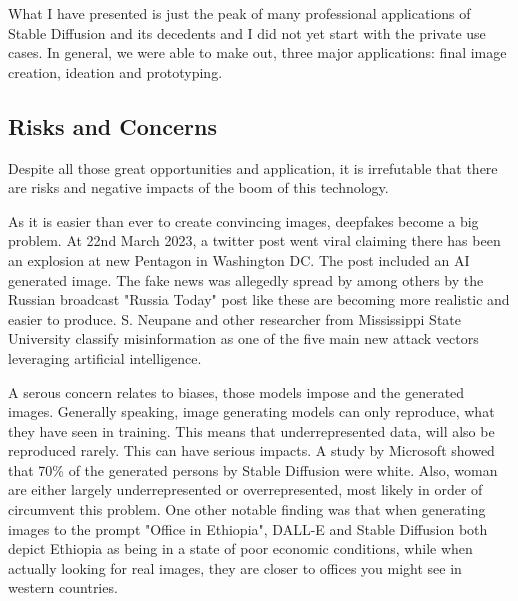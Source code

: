 \documentclass[11pt]{article}
\begin{document}
What I have presented is just the peak of many professional applications of Stable Diffusion and its decedents and I did not yet start with the private use cases. In general, we were able to make out, three major applications: final image creation, ideation and prototyping.

\subsection{Risks and Concerns}
Despite all those great opportunities and application, it is irrefutable that there are risks and negative impacts of the boom of this technology.

As it is easier than ever to create convincing images, deepfakes become a big problem. At 22nd March 2023, a twitter post went viral claiming there has been an explosion at new Pentagon in Washington DC. The post included an AI generated image. The fake news was allegedly spread by among others by the Russian broadcast "Russia Today"\cite{correctiv2023pentagonexplosion} post like these are becoming more realistic and easier to produce. S. Neupane and other researcher from Mississippi State University\cite{neupane2023impactsriskgenerativeai} classify misinformation as one of the five main new attack vectors leveraging artificial intelligence.

A serous concern relates to biases, those models impose and the generated images. Generally speaking, image generating models can only reproduce, what they have seen in training. This means that underrepresented data, will also be reproduced rarely. This can have serious impacts. A study by Microsoft\cite{naik2023socialbiasesthroughtexttoimage} showed that 70\% of the generated persons by Stable Diffusion were white. Also, woman are either largely underrepresented or overrepresented, most likely in order of circumvent this problem. One other notable finding was that when generating images to the prompt  "Office in Ethiopia", DALL-E and Stable Diffusion both depict Ethiopia as being in a state of poor economic conditions, while when actually looking for real images, they are closer to offices you might see in western countries.
\end{document}
